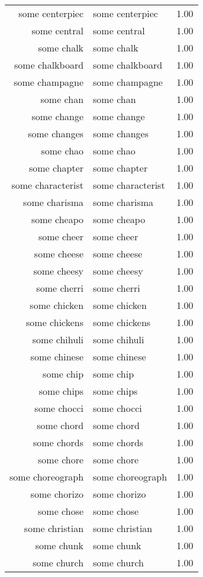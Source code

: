 \begin{table}[ht]
\begin{tabular}{rlr}
  some centerpiec & some centerpiec & 1.00 \\ 
  some central & some central & 1.00 \\ 
  some chalk & some chalk & 1.00 \\ 
  some chalkboard & some chalkboard & 1.00 \\ 
  some champagne & some champagne & 1.00 \\ 
  some chan & some chan & 1.00 \\ 
  some change & some change & 1.00 \\ 
  some changes & some changes & 1.00 \\ 
  some chao & some chao & 1.00 \\ 
  some chapter & some chapter & 1.00 \\ 
  some characterist & some characterist & 1.00 \\ 
  some charisma & some charisma & 1.00 \\ 
  some cheapo & some cheapo & 1.00 \\ 
  some cheer & some cheer & 1.00 \\ 
  some cheese & some cheese & 1.00 \\ 
  some cheesy & some cheesy & 1.00 \\ 
  some cherri & some cherri & 1.00 \\ 
  some chicken & some chicken & 1.00 \\ 
  some chickens & some chickens & 1.00 \\ 
  some chihuli & some chihuli & 1.00 \\ 
  some chinese & some chinese & 1.00 \\ 
  some chip & some chip & 1.00 \\ 
  some chips & some chips & 1.00 \\ 
  some chocci & some chocci & 1.00 \\ 
  some chord & some chord & 1.00 \\ 
  some chords & some chords & 1.00 \\ 
  some chore & some chore & 1.00 \\ 
  some choreograph & some choreograph & 1.00 \\ 
  some chorizo & some chorizo & 1.00 \\ 
  some chose & some chose & 1.00 \\ 
  some christian & some christian & 1.00 \\ 
  some chunk & some chunk & 1.00 \\ 
  some church & some church & 1.00 \\ 

\end{tabular}
\end{table}
